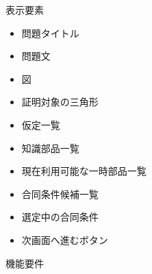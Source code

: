 \documentclass[a4paper,12pt]{ltjsarticle}
\begin{document}
表示要素
\begin{itemize}
  \item 問題タイトル
  \item 問題文
  \item 図
  \item 証明対象の三角形
  \item 仮定一覧
  \item 知識部品一覧
  \item 現在利用可能な一時部品一覧
  \item 合同条件候補一覧
  \item 選定中の合同条件
  \item 次画面へ進むボタン\\
\end{itemize}

機能要件
\end{document}
